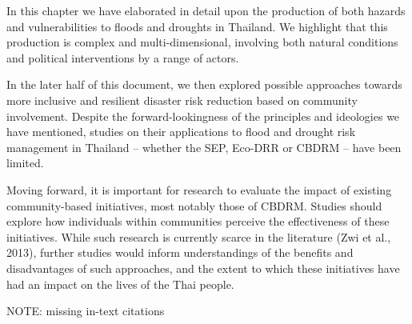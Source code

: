 In this chapter we have elaborated in detail upon the production of both hazards and vulnerabilities to floods and droughts in Thailand. We highlight that this production is complex and multi-dimensional, involving both natural conditions and political interventions by a range of actors. 

In the later half of this document, we then explored possible approaches towards more inclusive and resilient disaster risk reduction based on community involvement. Despite the forward-lookingness of the principles and ideologies we have mentioned, studies on their applications to flood and drought risk management in Thailand -- whether the SEP, Eco-DRR or CBDRM -- have been limited. 

Moving forward, it is important for research to evaluate the impact of existing community-based initiatives, most notably those of CBDRM. Studies should explore how individuals within communities perceive the effectiveness of these initiatives. While such research is currently scarce in the literature (Zwi et al., 2013), further studies would inform understandings of the benefits and disadvantages of such approaches, and the extent to which these initiatives have had an impact on the lives of the Thai people.

NOTE: missing in-text citations \citet{marks2011climate}
